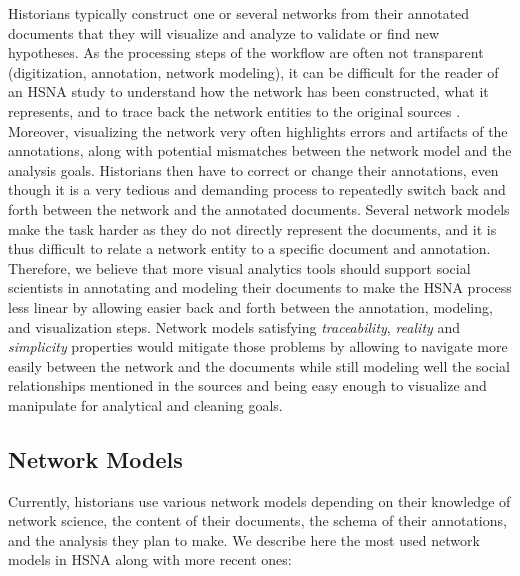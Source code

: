 Historians typically construct one or several networks from their annotated documents that they will visualize and analyze to validate or find new hypotheses.
As the processing steps of the workflow are often not transparent (digitization, annotation, network modeling), it can be difficult for the reader of an HSNA study to understand how the network has been constructed, what it represents, and to trace back the network entities to the original sources \cite{dufournaudCommentRendreVisible2018}.
Moreover, visualizing the network very often highlights errors and artifacts of the annotations, along with potential mismatches between the network model and the analysis goals.
Historians then have to correct or change their annotations, even though it is a very tedious and demanding process  to repeatedly switch back and forth between the network and the annotated documents.
Several network models make the task harder as they do not directly represent the documents, and it is thus difficult to relate a network entity to a specific document and annotation.
Therefore, we believe that more visual analytics tools should support social scientists in annotating and modeling their documents to make the HSNA process less linear by allowing easier back and forth between the annotation, modeling, and visualization steps.
Network models satisfying  \emph{traceability}, \emph{reality} and \emph{simplicity} properties would mitigate those problems by allowing to navigate more easily between the network and the documents while still modeling well the social relationships mentioned in the sources and being easy enough to visualize and manipulate for analytical and cleaning goals.

\subsection{Network Models}

Currently, historians use various network models depending on their knowledge of network science, the content of their documents, the schema of their annotations, and the analysis they plan to make.
We describe here the most used network models in HSNA along with more recent ones:

